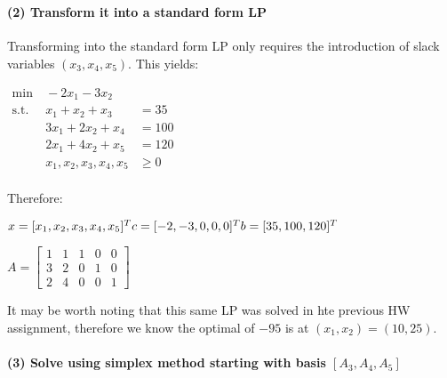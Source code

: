 \documentclass[11pt]{article}
\begin{document}
    \begin{center}
    \end{center}
    { \hspace*{\fill} \\}
    
    \hypertarget{transform-it-into-a-standard-form-lp}{%
\paragraph{(2) Transform it into a standard form
LP}\label{transform-it-into-a-standard-form-lp}}

Transforming into the standard form LP only requires the introduction of
slack variables \((x_3, x_4, x_5)\). This yields:

\(\begin{aligned} \text{min} & \ -2x_1 - 3x_2 \\ \text{s.t.} & \ x_1 + x_2 + x_3 & = 35 \\  & \ 3x_1 + 2x_2 + x_4 & = 100 \\  & \ 2x_1 + 4x_2 + x_5 & = 120 \\  & \ x_1,x_2,x_3,x_4,x_5 & \ge 0 \\ \end{aligned}\)

Therefore:

\(x = [x_1,x_2,x_3,x_4,x_5]^T \\ c = [-2, -3, 0, 0, 0]^T \\ b = [35,100,120]^T\)

\(A = \begin{bmatrix} 1 & 1 & 1 & 0 & 0 \\ 3 & 2 & 0 & 1 & 0 \\ 2 & 4 & 0 & 0 & 1 \end{bmatrix}\)

It may be worth noting that this same LP was solved in hte previous HW
assignment, therefore we know the optimal of \(-95\) is at
\((x_1, x_2) = (10, 25)\).

\hypertarget{solve-using-simplex-method-starting-with-basis-a_3-a_4-a_5}{%
\paragraph{\texorpdfstring{(3) Solve using simplex method starting with
basis
\([A_3, A_4, A_5]\)}{(3) Solve using simplex method starting with basis {[}A\_3, A\_4, A\_5{]}}}\label{solve-using-simplex-method-starting-with-basis-a_3-a_4-a_5}}
\end{document}
